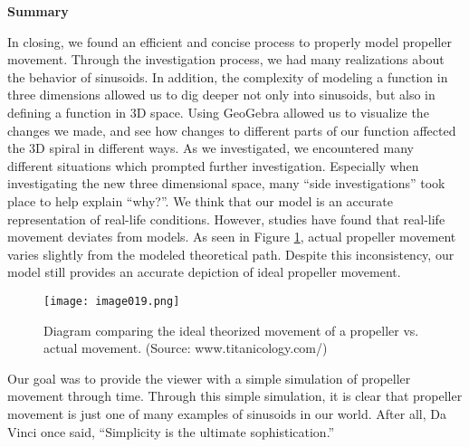 \noindent
\textbf{Summary}

In closing, we found an efficient and concise process to properly model propeller movement. Through the investigation process, we had many realizations about the behavior of sinusoids. In addition, the complexity of modeling a function in three dimensions allowed us to dig deeper not only into sinusoids, but also in defining a function in 3D space. Using GeoGebra allowed us to visualize the changes we made, and see how changes to different parts of our function affected the 3D spiral in different ways. As we investigated, we encountered many different situations which prompted further investigation. Especially when investigating the new three dimensional space, many “side investigations” took place to help explain “why?”. We think that our model is an accurate representation of real-life conditions. However, studies have found that real-life movement deviates from models. As seen in Figure \ref{fig:real}, actual propeller movement varies slightly from the modeled theoretical path. Despite this inconsistency, our model still provides an accurate depiction of ideal propeller movement.

\begin{figure}[h]
\texttt{[image: image019.png]}
\caption{Diagram comparing the ideal theorized movement of a propeller vs. actual movement. (Source: www.titanicology.com/)}
\label{fig:real}
\end{figure}

Our goal was to provide the viewer with a simple simulation of propeller movement through time. Through this simple simulation, it is clear that propeller movement is just one of many examples of sinusoids in our world. After all, Da Vinci once said, “Simplicity is the ultimate sophistication.”